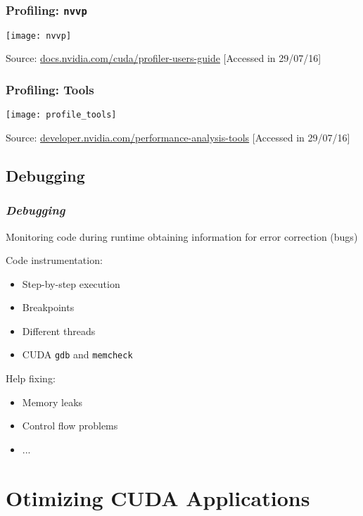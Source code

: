 \documentclass[10pt, compress]{beamer}
\begin{document}
\begin{frame}
    \frametitle{Profiling: \texttt{nvvp}}
    \centering
    \texttt{[image: nvvp]}

    \vfill
    \tiny{Source: \url{docs.nvidia.com/cuda/profiler-users-guide} [Accessed in 29/07/16]}
\end{frame}

\begin{frame}
    \frametitle{Profiling: Tools}
    \centering
    \texttt{[image: profile\_tools]}

    \vfill
    \tiny{Source: \url{developer.nvidia.com/performance-analysis-tools} [Accessed in 29/07/16]}
\end{frame}

\subsection{Debugging}

\begin{frame}
    \frametitle{\textit{Debugging}}
    Monitoring code during \alert{runtime}
    obtaining information for \alert{error correction} (\alert{bugs})
    \pause

    Code \alert{instrumentation}:
    \begin{itemize}
        \item \alert{Step-by-step} execution
            \pause
        \item \alert{Breakpoints}
            \pause
        \item Different \alert{threads}
            \pause
        \item CUDA \texttt{\alert{gdb}} and \texttt{\alert{memcheck}}
    \end{itemize}
    \pause

    Help fixing:
    \begin{itemize}
        \item Memory \alert{leaks}
            \pause
        \item \alert{Control flow} problems
            \pause
        \item ...
    \end{itemize}
\end{frame}

\section{Otimizing CUDA Applications}
\end{document}
